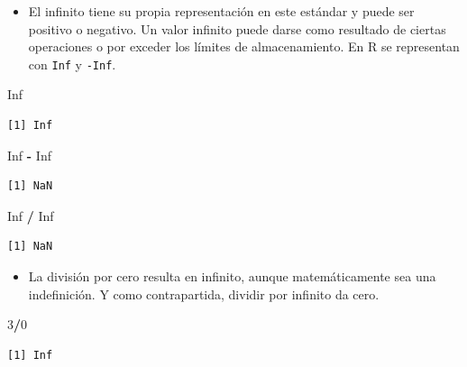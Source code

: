 \documentclass[openany]{book}
\newenvironment{Shaded}{\begin{snugshade}}{\end{snugshade}}
\newcommand{\DecValTok}[1]{\textcolor[rgb]{0.00,0.00,0.81}{#1}}
\newcommand{\OperatorTok}[1]{\textcolor[rgb]{0.81,0.36,0.00}{\textbf{#1}}}
\newcommand{\OtherTok}[1]{\textcolor[rgb]{0.56,0.35,0.01}{#1}}
\newcommand{\StringTok}[1]{\textcolor[rgb]{0.31,0.60,0.02}{#1}}
\providecommand{\tightlist}{%
  \setlength{\itemsep}{0pt}\setlength{\parskip}{0pt}}
\begin{document}
\begin{itemize}
\tightlist
\item
  El infinito tiene su propia representación en este estándar y puede ser positivo o negativo. Un valor infinito puede darse como resultado de ciertas operaciones o por exceder los límites de almacenamiento. En R se representan con \texttt{Inf} y \texttt{-Inf}.
\end{itemize}

\begin{Shaded}
\begin{Highlighting}[]
\OtherTok{Inf}
\end{Highlighting}
\end{Shaded}

\begin{verbatim}
[1] Inf
\end{verbatim}

\begin{Shaded}
\begin{Highlighting}[]
\OtherTok{Inf} \OperatorTok{-}\StringTok{ }\OtherTok{Inf}
\end{Highlighting}
\end{Shaded}

\begin{verbatim}
[1] NaN
\end{verbatim}

\begin{Shaded}
\begin{Highlighting}[]
\OtherTok{Inf} \OperatorTok{/}\StringTok{ }\OtherTok{Inf}
\end{Highlighting}
\end{Shaded}

\begin{verbatim}
[1] NaN
\end{verbatim}

\begin{itemize}
\tightlist
\item
  La división por cero resulta en infinito, aunque matemáticamente sea una indefinición. Y como contrapartida, dividir por infinito da cero.
\end{itemize}

\begin{Shaded}
\begin{Highlighting}[]
\DecValTok{3}\OperatorTok{/}\DecValTok{0}
\end{Highlighting}
\end{Shaded}

\begin{verbatim}
[1] Inf
\end{verbatim}
\end{document}

